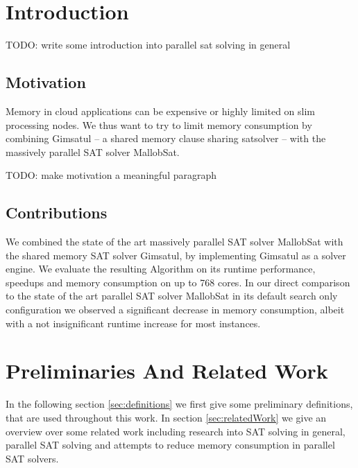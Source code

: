 \documentclass[12pt,a4paper,twoside]{scrartcl}
\numberwithin{equation}{section}
\begin{document}
\tableofcontents

\clearpage


\listoffigures
\listoftables

\clearpage


\section{Introduction}

TODO: write some introduction into parallel sat solving in general

\subsection{Motivation}

Memory in cloud applications can be expensive or highly limited on slim processing nodes. We thus want to try to limit memory consumption by combining Gimsatul -- a shared memory clause sharing satsolver -- with the massively parallel SAT solver MallobSat.


TODO: make motivation a meaningful paragraph

\subsection{Contributions}

We combined the state of the art massively parallel SAT solver MallobSat with the shared memory SAT solver Gimsatul, by implementing Gimsatul as a solver engine. We evaluate the resulting Algorithm on its runtime performance, speedups and memory consumption on up to 768 cores. In our direct comparison to the state of the art parallel SAT solver MallobSat in its default search only configuration we observed a significant decrease in memory consumption, albeit with a not insignificant runtime increase for most instances.


\section{Preliminaries And Related Work}

In the following section \ref{sec:definitions} we first give some preliminary definitions, that are used throughout this work. In section \ref{sec:relatedWork} we give an overview over some related work including research into SAT solving in general, parallel SAT solving and attempts to reduce memory consumption in parallel SAT solvers.
\end{document}
